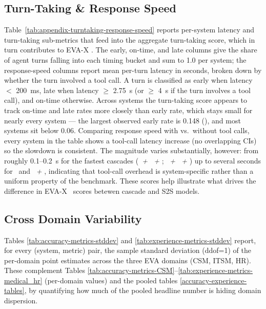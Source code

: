 \subsection{Turn-Taking \& Response Speed}
 Table~\ref{tab:appendix-turntaking-response-speed} reports per-system latency and turn-taking sub-metrics that feed into the aggregate turn-taking score, which in turn contributes to EVA-X \passatone. The early, on-time, and late columns give the share of agent turns falling into each timing bucket and sum to 1.0 per system; the response-speed columns report mean per-turn latency in seconds, broken down by whether the turn involved a tool call. A turn is classified as early when latency $<$ 200~ms, late when latency $\geq$ 2.75~s (or $\geq$ 4~s if the turn involves a tool call), and on-time otherwise. Across systems the turn-taking score appears to track on-time and late rates more closely than early rate, which stays small for nearly every system — the largest observed early rate is 0.148 (\emph{\gptrealtimeminifull}), and most systems sit below 0.06. Comparing response speed with vs.\ without tool calls, every system in the table shows a tool-call latency increase (no overlapping CIs) so the slowdown is consistent. The magnitude varies substantially, however: from roughly 0.1--0.2~s for the fastest cascades (\emph{\whisperfull~+ \qwenfull~+ \voxtralfull}; \emph{\inkfull~+ \haikufull~+ \sonicfull}) up to several seconds for \emph{\ultravoxfull}~and \emph{\geminiflashfull~+ \geminiflashttsfull}, indicating that tool-call overhead is system-specific rather than a uniform property of the benchmark. These scores help illustrate what drives the difference in EVA-X \passatone~scores betewen cascade and S2S models.



\subsection{Cross Domain Variability}
Tables \ref{tab:accuracy-metrics-stddev} and \ref{tab:experience-metrics-stddev} report, for every (system, metric) pair, the sample standard deviation (ddof=1) of the per-domain point estimates across the three EVA domains (CSM, ITSM, HR). These complement Tables \ref{tab:accuracy-metrics-CSM}–\ref{tab:experience-metrics-medical_hr} (per-domain values) and the pooled tables \ref{accuracy-experience-tables}, by quantifying how much of the pooled headline number is hiding domain dispersion.

